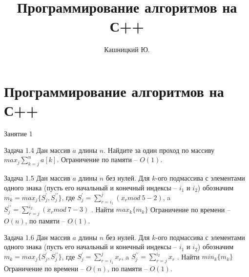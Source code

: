 \documentclass[unicode,10pt]{beamer}
\title[ML\&DM]{Программирование алгоритмов на С++}
\author[]{Кашницкий Ю.}
\begin{document}
\section{Программирование алгоритмов на С++}
\begin{frame}{Занятие 1}

\begin{block}{Задача 1.4}
Дан массив $a$ длины $n$. Найдите за один проход по массиву $max_j \sum_{k=j}^na[k]$. Ограничение по памяти -- $O(1)$.
\end{block}

\begin{block}{Задача 1.5}
Дан массив $a$ длины $n$  без нулей. Для $k$-ого подмассива с элементами одного знака (пусть его начальный и конечный индексы -- $i_1$ и $i_2$)
обозначим $m_k = max_j\{S_j^\prime, S_j^{\prime\prime}\}$, где $S_j^\prime = \sum_{r=i_1}^j(x_r mod\ 5 - 2)$, a $S_j^{\prime\prime} = \sum_{r=j}^{i_2}(x_r mod\ 7 - 3)$ . 
Найти $max_k\{m_k\}$
Ограничение по времени -- $O(n)$, по памяти -- $O(1)$.
\end{block}

\begin{block}{Задача 1.6}
Дан массив $a$ длины $n$  без нулей. Для $k$-ого подмассива с элементами одного знака (пусть его начальный и конечный индексы -- $i_1$ и $i_2$)
обозначим $m_k = max_j\{S_j^\prime, S_j^{\prime\prime}\}$, где $S_j^\prime = \sum_{r=i_1}^jx_r$, a $S_j^{\prime\prime} = \sum_{r=j}^{i_2}x_r$ . 
Найти $min_k\{m_k\}$
Ограничение по времени -- $O(n)$, по памяти -- $O(1)$.
\end{block}

\end{frame}
\end{document}

